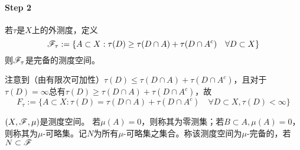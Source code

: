 \documentclass{ctexart}
\begin{document}
\paragraph{Step 2}
\begin{Thm}[Caratheodory]
  若$\tau$是$X$上的外测度，定义
  \[\mathscr{F}_{\tau}:=\{A\subset X:\tau(D)\geq \tau(D\cap A)+\tau(D\cap A^{c})\quad \forall D\subset X\}\]
  则$\mathscr{F}_{\tau}$是完备的测度空间。
\end{Thm}

注意到（由有限次可加性）$\tau(D)\leq \tau(D\cap A)+\tau(D\cap A^{c})$，且对于$\tau(D)=\infty$总有$\tau(D)\geq \tau(D\cap A)+\tau(D\cap A^{c})$，故
\[F_{\tau}:=\{A\subset X:\tau(D)= \tau(D\cap A)+\tau(D\cap A^{c})\quad \forall D\subset X,\tau(D)<\infty\}\]

\begin{Def}[完备性]
  $(X,\mathscr{F},\mu)$是测度空间。 若$\mu(A)=0$，则称其为零测集；若$B\subset A,\mu(A)=0$，则称其为$\mu$-可略集。记$N$为所有$\mu$-可略集之集合。称该测度空间为$\mu$-完备的，若$N\subset \mathscr{F}$
\end{Def}
\end{document}
